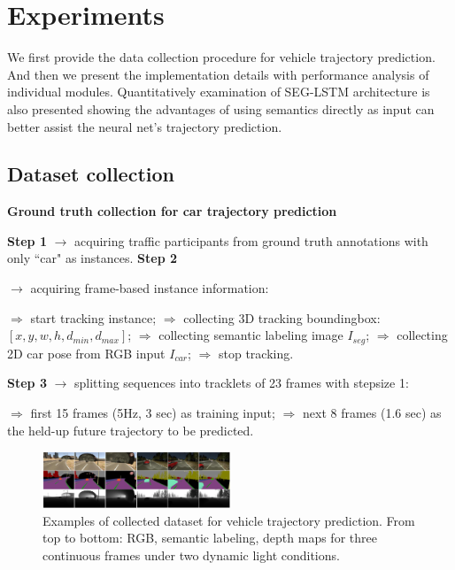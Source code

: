 \documentclass[10pt,twocolumn,letterpaper]{article}
\newlength\myindent
\newcommand\bindent[1][\myindent]{%
  \begingroup
  \setlength{\itemindent}{#1}
  \addtolength{\algorithmicindent}{#1}
}
\newcommand\eindent{\endgroup}
\begin{document}
\section{Experiments}

We first provide the data collection procedure for vehicle trajectory prediction. And then we present the implementation details with performance analysis of individual modules. Quantitatively examination of SEG-LSTM architecture is also presented showing the advantages of using semantics directly as input can better assist the neural net's trajectory prediction.

\subsection{Dataset collection}
\begin{algorithm}[t]
\begin{algorithmic}
\caption*{\textbf{Ground truth collection for car trajectory prediction}}\label{list:dataset_collection}
\small{
\STATE \textbf{Step 1} $\rightarrow $ acquiring traffic participants from ground truth annotations with only ``car" as instances.
\STATE \textbf{Step 2} {$\rightarrow $ acquiring frame-based instance information:
{
\bindent
    \STATE $\Rightarrow$ start tracking instance;
    \STATE $\Rightarrow$ collecting 3D tracking boundingbox: $[x, y, w, h, d_{min}, d_{max}]$;
    \STATE $\Rightarrow$ collecting semantic labeling image $I_{seg}$;
    \STATE $\Rightarrow$ collecting 2D car pose from RGB input $I_{car}$;
    \STATE $\Rightarrow$ stop tracking.
    \ENDIF\eindent}
  }
\STATE \textbf{Step 3} $\rightarrow $ splitting sequences into tracklets of 23 frames with stepsize 1:
{\bindent
    \STATE $\Rightarrow$  first 15 frames (5Hz, 3 sec) as training input;
  \STATE $\Rightarrow$  next 8 frames (1.6 sec) as the held-up future trajectory to be predicted.
  \eindent}
}
\end{algorithmic}
\end{algorithm}



\begin{figure}[t]
        \centering
        \includegraphics[width=0.5\textwidth]{figures/dataset.pdf}
        \caption{
        \small{Examples of collected dataset for vehicle trajectory prediction. From top to bottom: RGB, semantic labeling, depth maps for three continuous frames under two dynamic light conditions.}
        }
        \label{fig:dataset}
\end{figure}
\end{document}
